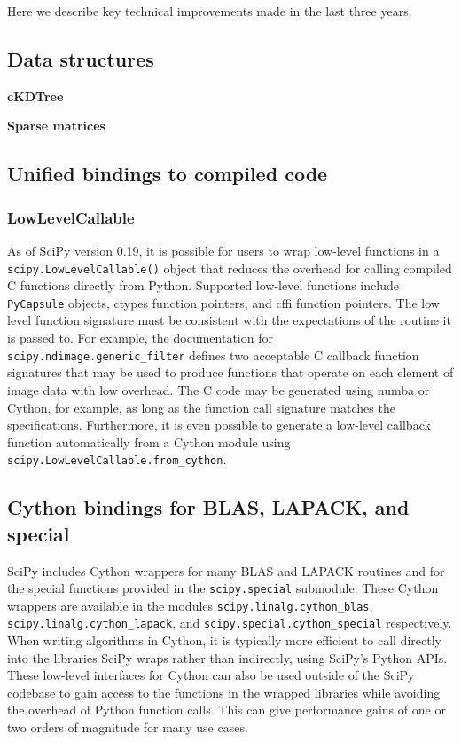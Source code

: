 \documentclass[fleqn,10pt]{wlscirep}
\begin{document}
Here we describe key technical improvements made in the last three years.

\subsection*{Data structures}
\textbf{cKDTree}

\textbf{Sparse matrices}

\subsection*{Unified bindings to compiled code}
\subsubsection*{LowLevelCallable}
As of SciPy version 0.19, it is possible for users to wrap low-level
functions in a \texttt{scipy.LowLevelCallable()} object that reduces
the overhead for calling compiled C functions directly from Python.
Supported low-level functions include \texttt{PyCapsule} objects,
ctypes function pointers, and cffi function pointers. The low level
function signature must be consistent with the expectations of the
routine it is passed to. For example, the documentation for
\texttt{scipy.ndimage.generic\_filter} defines two acceptable C callback
function signatures that may be used to produce functions that operate
on each element of image data with low overhead. The C code may be
generated using numba or Cython, for example, as long as the function
call signature matches the specifications. Furthermore, it is even
possible to generate a low-level callback function automatically
from a Cython module using \texttt{scipy.LowLevelCallable.from\_cython}.

\subsection*{Cython bindings for BLAS, LAPACK, and special}

SciPy includes Cython\cite{behnel2011cython} wrappers for many BLAS and LAPACK\cite{LAPACK} routines and for the special functions provided in the \texttt{scipy.{\allowbreak}special} submodule.
These Cython wrappers are available in the modules \texttt{scipy.{\allowbreak}linalg.{\allowbreak}cython\_blas}, \texttt{scipy.{\allowbreak}linalg.{\allowbreak}cython\_lapack}, and \texttt{scipy.{\allowbreak}special.{\allowbreak}cython\_special} respectively.
When writing algorithms in Cython, it is typically more efficient to call directly into the libraries SciPy wraps rather than indirectly, using SciPy's Python APIs.
These low-level interfaces for Cython can also be used outside of the SciPy codebase to gain access to the functions in the wrapped libraries while avoiding the overhead of Python function calls.
This can give performance gains of one or two orders of magnitude for many use cases.
\end{document}
